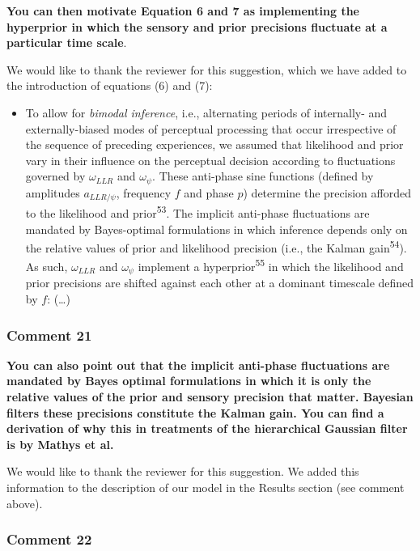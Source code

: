 \documentclass[
]{article}
\providecommand{\tightlist}{%
  \setlength{\itemsep}{0pt}\setlength{\parskip}{0pt}}
\begin{document}
\textbf{You can then motivate Equation 6 and 7 as implementing the
hyperprior in which the sensory and prior precisions fluctuate at a
particular time scale}.

We would like to thank the reviewer for this suggestion, which we have
added to the introduction of equations (6) and (7):

\begin{itemize}
\tightlist
\item
  To allow for \emph{bimodal inference}, i.e., alternating periods of
  internally- and externally-biased modes of perceptual processing that
  occur irrespective of the sequence of preceding experiences, we
  assumed that likelihood and prior vary in their influence on the
  perceptual decision according to fluctuations governed by
  \(\omega_{LLR}\) and \(\omega_{\psi}\). These anti-phase sine
  functions (defined by amplitudes \(a_{LLR/\psi}\), frequency \(f\) and
  phase \(p\)) determine the precision afforded to the likelihood and
  prior\textsuperscript{53}. The implicit anti-phase fluctuations are
  mandated by Bayes-optimal formulations in which inference depends only
  on the relative values of prior and likelihood precision (i.e., the
  Kalman gain\textsuperscript{54}). As such, \(\omega_{LLR}\) and
  \(\omega_{\psi}\) implement a hyperprior\textsuperscript{55} in which
  the likelihood and prior precisions are shifted against each other at
  a dominant timescale defined by \(f\): (\ldots)
\end{itemize}

\hypertarget{comment-21}{%
\subsubsection{Comment 21}\label{comment-21}}

\textbf{You can also point out that the implicit anti-phase fluctuations
are mandated by Bayes optimal formulations in which it is only the
relative values of the prior and sensory precision that matter. Bayesian
filters these precisions constitute the Kalman gain. You can find a
derivation of why this in treatments of the hierarchical Gaussian filter
is by Mathys et al.}

We would like to thank the reviewer for this suggestion. We added this
information to the description of our model in the Results section (see
comment above).

\hypertarget{comment-22}{%
\subsubsection{Comment 22}\label{comment-22}}
\end{document}
